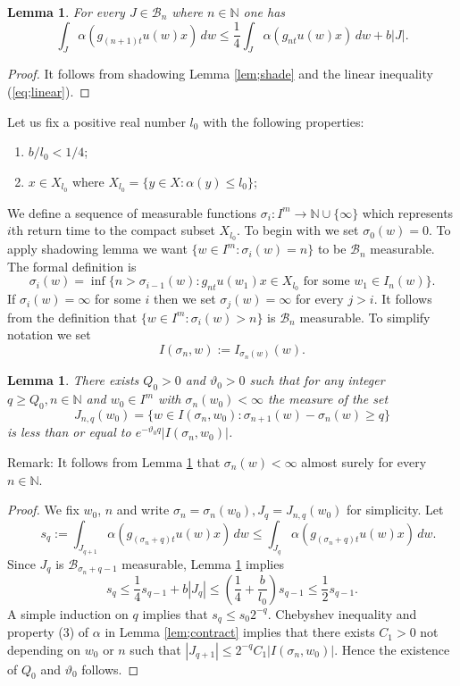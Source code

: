 \documentclass[12pt]{amsart}
\newtheorem{lem}[thm]{Lemma}
\theoremstyle{definition}
\theoremstyle{remark}
\numberwithin{equation}{section}
\begin{document}
\begin{lem}\label{lem;basic ineq}
For every  $J\in \mathcal B_n$ where $n\in \mathbb N$  one has
\[
\int_{J}\alpha(g_{{(n+1)}t}u(w)x)\, dw\le \frac{1}{4}\int_{J}\alpha(g_{nt}u(w)x)\, dw +b|J|.
\]
\end{lem}
\begin{proof}
It follows from  shadowing Lemma \ref{lem;shade} and  the linear inequality (\ref{eq;linear}).
\end{proof}

Let us fix a positive real number $l_0$ with the following properties:
\begin{enumerate}[label=(\roman*)]
\item   $b/l_0<1/4$; 
 \item $x\in X_{l_0}$ where $X_{l_0}=\{y\in X: \alpha(y)\le l_0\}$;
\end{enumerate}
We 
 define a sequence of measurable  functions $\sigma_i: I^m\to \mathbb N\cup\{\infty\}$ which represents 
$i$th 
return time to the compact subset $X_{l_0}$.
To begin with we set $\sigma_0(w)=0$.
To apply shadowing lemma we  want $\{w\in I^m: \sigma_i(w)=n\}$ to be 
$\mathcal B_n$ measurable. 
 The formal definition 
is
\begin{equation}\label{eq;return time}
\sigma_i(w)=\inf\{ n>\sigma_{i-1}(w): g_{nt}u(w_1)x\in X_{l_0} \mbox{ for some } w_1\in I_n(w)\}.
\end{equation}
If $\sigma_i(w)=\infty $ for some $i$ then we set $\sigma_j(w)=\infty$ for every $j>i$.
It follows from the definition that $\{w\in I^m: \sigma_i(w)> n\}$ is $\mathcal B_n$ measurable.  
To simplify notation we set
\[
I(\sigma_n,w):=I_{\sigma_n(w)}(w).
\]

\begin{lem}\label{lem;pre expon}
There exists   $Q_0>0$ and $\vartheta_0>0$ such that for any integer $q\ge Q_0, n\in \mathbb N$ and $w_0\in I^m$
with
$\sigma_n(w_0)<\infty$
the measure of the  set 
\begin{equation}\label{eq;expjump}
J_{n,q}(w_0)=\{w\in I(\sigma_n, w_0): \sigma_{n+1}(w)-\sigma_n(w)\ge q\}
\end{equation}
is less than or equal to 
$ e^{-\vartheta_0 q}|I(\sigma_n, w_0)|$.
\end{lem}
Remark: It follows from Lemma \ref{lem;pre expon} that  $\sigma_n(w)<\infty$ almost surely for every $n\in \mathbb N$. 
\begin{proof}
We fix $w_0$, $n$ and write  $\sigma_n=\sigma_n(w_0), J_q={J_{n,q}}(w_0)$ for simplicity.
Let 
\[
\quad s_q:=\int_{J_{q+1}}\alpha(g_{(\sigma_n+q)t}u(w)x)\, dw
\le  \int_{J_{q}}\alpha(g_{(\sigma_n+q)t}u(w)x)\, dw.
\]
Since $J_{q}$ is $\mathcal B_{\sigma_n+q-1}$ measurable,  Lemma \ref{lem;basic ineq}  implies
\[
s_q\le \frac{1}{4}s_{q-1}+b|J_{q}|\le \left(\frac{1}{4}+\frac{b}{l_0}\right)s_{q-1}\le \frac{1}{2}s_{q-1}.
\]
A simple induction on $q$ implies  that 
$
s_q\le s_0 2^{-q}.
$
  Chebyshev inequality  
  and  property (3) of $\alpha$ in Lemma \ref{lem;contract}
  implies  that there exists $C_1>0$ not depending on $w_0$ or $n$ such that  $|J_{q+1}|\le 2^{-q }C_1 
  |I(\sigma_n, w_0)|$. 
  Hence  the existence of $Q_0$ and $\vartheta_0$ follows.
\end{proof}
\end{document}
